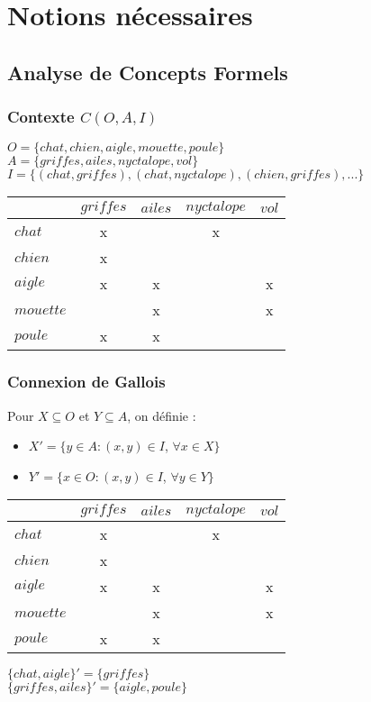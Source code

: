 \documentclass{beamer}
\begin{document}
\section{Notions nécessaires}

\subsection{Analyse de Concepts Formels}

\begin{frame}
	\frametitle{Contexte $C(O, A, I)$}
	$O = \{chat, chien, aigle, mouette, poule\}$\\
	$A = \{griffes, ailes, nyctalope, vol\}$\\
	$I = \{(chat, griffes), (chat, nyctalope), (chien, griffes), ...\}$
	\begin{center}
		\begin{tabular}{ l | c c c c }
			 & $griffes$ & $ailes$ & $nyctalope$ & $vol$ \\
			\hline
			$chat$ & x & & x & \\
			$chien$ & x & & & \\
			$aigle$ & x & x & & x \\
			$mouette$ & & x & & x \\
			$poule$ & x & x & & \\
		\end{tabular}
	\end{center}
\end{frame}

\begin{frame}
	\frametitle{Connexion de Gallois}
		 {
			\begin{definition}
				Pour $X \subseteq O$ et $Y \subseteq A$, on définie :
				\begin{itemize}
					\item $X' = \{y \in A : (x, y) \in I$, $\forall x \in X\}$
					\item $Y' = \{x \in O : (x, y) \in I$, $\forall y \in Y\}$
				\end{itemize}
			\end{definition}
		}\only<2| handout:2> {
			\begin{center}
				\begin{tabular}{ l | c c c c }
					 & $griffes$ & $ailes$ & $nyctalope$ & $vol$ \\
					\hline
					$chat$ & x & & x & \\
					$chien$ & x & & & \\
					$aigle$ & x & x & & x \\
					$mouette$ & & x & & x \\
					$poule$ & x & x & & \\
				\end{tabular}
			\end{center}
			$\{chat, aigle\}' = \{griffes\}$\\
			$\{griffes, ailes\}' = \{aigle, poule\}$
		}
\end{frame}
\end{document}
